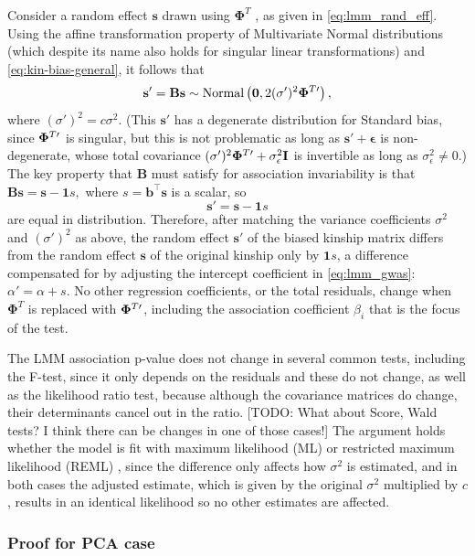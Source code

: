 \documentclass[11pt]{article}
\newcommand{\kinMat}[1][T]{%
  \ensuremath{%
    \mathbf{\Phi}^{#1}
  }%
  \xspace%
}%
\newcommand{\kinMatPrime}{%
  \ensuremath{%
    \mathbf{\Phi}^{T\prime}
  }%
  \xspace%
}%
\begin{document}
Consider a random effect $\mathbf{s}$ drawn using \kinMat, as given in \cref{eq:lmm_rand_eff}.
Using the affine transformation property of Multivariate Normal distributions (which despite its name also holds for singular linear transformations) and \cref{eq:kin-bias-general}, it follows that
$$
\mathbf{s}'
=
\mathbf{B} \mathbf{s}
\sim
\text{Normal} \left( \mathbf{0}, 2 (\sigma')^2 \kinMatPrime \right),
$$
where $(\sigma')^2 = c \sigma^2$.
(This $\mathbf{s}'$ has a degenerate distribution for Standard bias, since $\kinMatPrime$ is singular, but this is not problematic as long as $\mathbf{s}' + \boldsymbol{\epsilon}$ is non-degenerate, whose total covariance $(\sigma')^2 \kinMatPrime + \sigma^2_\epsilon \mathbf{I}$ is invertible as long as $\sigma^2_\epsilon \ne 0$.)
The key property that $\mathbf{B}$ must satisfy for association invariability is that
$
\mathbf{B} \mathbf{s}
=
\mathbf{s} - \mathbf{1} s
,
$
where $s = \mathbf{b}^\intercal \mathbf{s}$ is a scalar, so
$$
\mathbf{s}' = \mathbf{s} - \mathbf{1} s
$$
are equal in distribution.
Therefore, after matching the variance coefficients $\sigma^2$ and $(\sigma')^2$ as above, the random effect $\mathbf{s}'$ of the biased kinship matrix differs from the random effect $\mathbf{s}$ of the original kinship only by $\mathbf{1} s$, a difference compensated for by adjusting the intercept coefficient in \cref{eq:lmm_gwas}: $\alpha' = \alpha + s$.
No other regression coefficients, or the total residuals, change when \kinMat is replaced with $\kinMatPrime$, including the association coefficient $\beta_i$ that is the focus of the test.

The LMM association p-value does not change in several common tests, including the F-test, since it only depends on the residuals and these do not change, as well as the likelihood ratio test, because although the covariance matrices do change, their determinants cancel out in the ratio.
[TODO: What about Score, Wald tests?  I think there can be changes in one of those cases!]
The argument holds whether the model is fit with maximum likelihood (ML) or restricted maximum likelihood (REML) \citep{kang_efficient_2008}, since the difference only affects how $\sigma^2$ is estimated, and in both cases the adjusted estimate, which is given by the original $\sigma^2$ multiplied by $c$, results in an identical likelihood so no other estimates are affected.

\subsubsection{Proof for PCA case}
\end{document}
